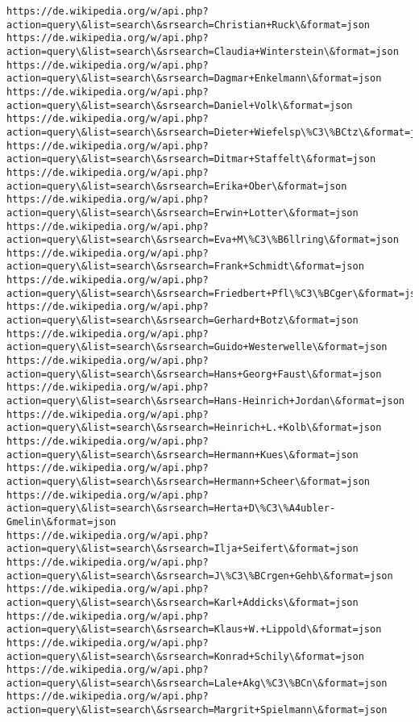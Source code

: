 \documentclass[11pt]{article}
\begin{document}
\begin{Verbatim}[commandchars=\\\{\}]
https://de.wikipedia.org/w/api.php?action=query\&list=search\&srsearch=Christian+Ruck\&format=json
https://de.wikipedia.org/w/api.php?action=query\&list=search\&srsearch=Claudia+Winterstein\&format=json
https://de.wikipedia.org/w/api.php?action=query\&list=search\&srsearch=Dagmar+Enkelmann\&format=json
https://de.wikipedia.org/w/api.php?action=query\&list=search\&srsearch=Daniel+Volk\&format=json
https://de.wikipedia.org/w/api.php?action=query\&list=search\&srsearch=Dieter+Wiefelsp\%C3\%BCtz\&format=json
https://de.wikipedia.org/w/api.php?action=query\&list=search\&srsearch=Ditmar+Staffelt\&format=json
https://de.wikipedia.org/w/api.php?action=query\&list=search\&srsearch=Erika+Ober\&format=json
https://de.wikipedia.org/w/api.php?action=query\&list=search\&srsearch=Erwin+Lotter\&format=json
https://de.wikipedia.org/w/api.php?action=query\&list=search\&srsearch=Eva+M\%C3\%B6llring\&format=json
https://de.wikipedia.org/w/api.php?action=query\&list=search\&srsearch=Frank+Schmidt\&format=json
https://de.wikipedia.org/w/api.php?action=query\&list=search\&srsearch=Friedbert+Pfl\%C3\%BCger\&format=json
https://de.wikipedia.org/w/api.php?action=query\&list=search\&srsearch=Gerhard+Botz\&format=json
https://de.wikipedia.org/w/api.php?action=query\&list=search\&srsearch=Guido+Westerwelle\&format=json
https://de.wikipedia.org/w/api.php?action=query\&list=search\&srsearch=Hans+Georg+Faust\&format=json
https://de.wikipedia.org/w/api.php?action=query\&list=search\&srsearch=Hans-Heinrich+Jordan\&format=json
https://de.wikipedia.org/w/api.php?action=query\&list=search\&srsearch=Heinrich+L.+Kolb\&format=json
https://de.wikipedia.org/w/api.php?action=query\&list=search\&srsearch=Hermann+Kues\&format=json
https://de.wikipedia.org/w/api.php?action=query\&list=search\&srsearch=Hermann+Scheer\&format=json
https://de.wikipedia.org/w/api.php?action=query\&list=search\&srsearch=Herta+D\%C3\%A4ubler-Gmelin\&format=json
https://de.wikipedia.org/w/api.php?action=query\&list=search\&srsearch=Ilja+Seifert\&format=json
https://de.wikipedia.org/w/api.php?action=query\&list=search\&srsearch=J\%C3\%BCrgen+Gehb\&format=json
https://de.wikipedia.org/w/api.php?action=query\&list=search\&srsearch=Karl+Addicks\&format=json
https://de.wikipedia.org/w/api.php?action=query\&list=search\&srsearch=Klaus+W.+Lippold\&format=json
https://de.wikipedia.org/w/api.php?action=query\&list=search\&srsearch=Konrad+Schily\&format=json
https://de.wikipedia.org/w/api.php?action=query\&list=search\&srsearch=Lale+Akg\%C3\%BCn\&format=json
https://de.wikipedia.org/w/api.php?action=query\&list=search\&srsearch=Margrit+Spielmann\&format=json

\end{Verbatim}
\end{document}
